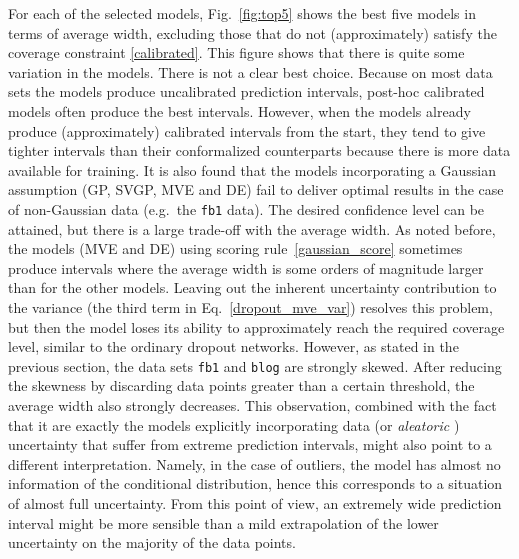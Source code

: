 \documentclass[smallcondensed]{svjour3}
\begin{document}
    For each of the selected models, Fig.~\ref{fig:top5} shows the best five models in terms of average width, excluding those that do not (approximately) satisfy the coverage constraint \eqref{calibrated}. This figure shows that there is quite some variation in the models. There is not a clear best choice. Because on most data sets the models produce uncalibrated prediction intervals, post-hoc calibrated models often produce the best intervals. However, when the models already produce (approximately) calibrated intervals from the start, they tend to give tighter intervals than their conformalized counterparts because there is more data available for training. It is also found that the models incorporating a Gaussian assumption (GP, SVGP, MVE and DE) fail to deliver optimal results in the case of non-Gaussian data (e.g.\ the \texttt{fb1} data). The desired confidence level can be attained, but there is a large trade-off with the average width. As noted before, the models (MVE and DE) using scoring rule~\eqref{gaussian_score} sometimes produce intervals where the average width is some orders of magnitude larger than for the other models. Leaving out the inherent uncertainty contribution to the variance (the third term in Eq.~\eqref{dropout_mve_var}) resolves this problem, but then the model loses its ability to approximately reach the required coverage level, similar to the ordinary dropout networks. However, as stated in the previous section, the data sets \texttt{fb1} and  \texttt{blog} are strongly skewed. After reducing the skewness by discarding data points greater than a certain threshold, the average width also strongly decreases. This observation, combined with the fact that it are exactly the models explicitly incorporating data (or \textit{aleatoric} \cite{kendallgal}) uncertainty that suffer from extreme prediction intervals, might also point to a different interpretation. Namely, in the case of outliers, the model has almost no information of the conditional distribution, hence this corresponds to a situation of almost full uncertainty. From this point of view, an extremely wide prediction interval might be more sensible than a mild extrapolation of the lower uncertainty on the majority of the data points.
\end{document}
